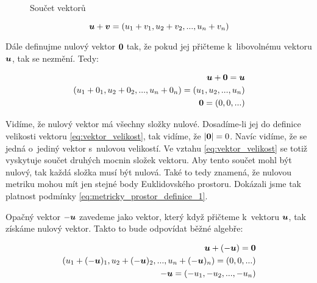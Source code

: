 \begin{figure}[!h]
\centering
{}
\caption{Součet vektorů}
\label{img:soucet_vektoru}
\end{figure}

\begin{equation}
\label{eq:euklidovsky_prostor_vektor_soucet}
\boldsymbol{u} + \boldsymbol{v} = (u_1 + v_1, u_2 + v_2, ..., u_n + v_n)
\end{equation}

Dále definujme nulový vektor \(\boldsymbol{0}\) tak, že pokud jej přičteme k~libovolnému vektoru \(\boldsymbol{u}\), tak se nezmění. Tedy:

\begin{equation}
\begin{split}
\boldsymbol{u} + \boldsymbol{0} = \boldsymbol{u} \\
(u_1 + 0_1, u_2 + 0_2, ..., u_n + 0_n) = (u_1, u_2, ..., u_n ) \\
\boldsymbol{0} = (0, 0, ...)
\end{split}
\end{equation}

Vidíme, že nulový vektor má všechny složky nulové. Dosadíme-li jej do definice velikosti vektoru \eqref{eq:vektor_velikost}, tak vidíme, že \(|\boldsymbol{0}| = 0\). Navíc vidíme, že se jedná o~jediný vektor s~nulovou velikostí. Ve vztahu \eqref{eq:vektor_velikost} se totiž vyskytuje součet druhých mocnin složek vektoru. Aby tento součet mohl být nulový, tak každá složka musí být nulová. Také to tedy znamená, že nulovou metriku mohou mít jen stejné body Euklidovského prostoru. Dokázali jsme tak platnost podmínky \eqref{eq:metricky_prostor_definice_1}.

Opačný vektor \(-\boldsymbol{u}\) zavedeme jako vektor, který když přičteme k~vektoru \(\boldsymbol{u}\), tak získáme nulový vektor. Takto to bude odpovídat běžné algebře:

\begin{equation}
\begin{split}
\boldsymbol{u} + (-\boldsymbol{u}) = \boldsymbol{0} \\
(u_1 + (-\boldsymbol{u})_1, u_2 + (-\boldsymbol{u})_2, ..., u_n + (-\boldsymbol{u})_n) = (0, 0, ...) \\
-\boldsymbol{u} = (-u_1, -u_2, ..., -u_n)
\end{split}
\end{equation}

